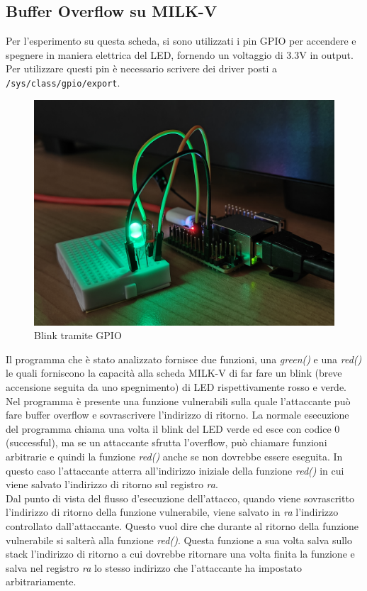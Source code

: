 \subsection*{Buffer Overflow su MILK-V}
Per l'esperimento su questa scheda, si sono utilizzati i pin GPIO per accendere e spegnere in maniera elettrica del LED, fornendo un voltaggio di 3.3V in output. Per utilizzare questi pin è necessario scrivere dei driver posti a \texttt{/sys/class/gpio/export}.
\FloatBarrier
\vspace{1cm}
\begin{figure}[!htbp]
    \centering
    \includegraphics[width=0.5\linewidth]{images/blink.jpg}
    \caption{Blink tramite GPIO}
\end{figure}
\vspace{1cm}
\FloatBarrier
Il programma che è stato analizzato fornisce due funzioni, una \textit{green()} e una \textit{red()} le quali forniscono la capacità alla scheda MILK-V di far fare un blink (breve accensione seguita da uno spegnimento) di LED rispettivamente rosso e verde.\\
Nel programma è presente una funzione vulnerabili sulla quale l'attaccante può fare buffer overflow e sovrascrivere l'indirizzo di ritorno. La normale esecuzione del programma chiama una volta il blink del LED verde ed esce con codice 0 (successful), ma se un attaccante sfrutta l'overflow, può chiamare funzioni arbitrarie e quindi la funzione \textit{red()} anche se non dovrebbe essere eseguita. In questo caso l'attaccante atterra all'indirizzo iniziale della funzione \textit{red()} in cui viene salvato l'indirizzo di ritorno sul registro \textit{ra}.\\
\newline
Dal punto di vista del flusso d'esecuzione dell'attacco, quando viene sovrascritto l'indirizzo di ritorno della funzione vulnerabile, viene salvato in \textit{ra} l'indirizzo controllato dall'attaccante. Questo vuol dire che durante al ritorno della funzione vulnerabile si salterà alla funzione \textit{red()}. Questa funzione a sua volta salva sullo stack l'indirizzo di ritorno a cui dovrebbe ritornare una volta finita la funzione e salva nel registro \textit{ra} lo stesso indirizzo che l'attaccante ha impostato arbitrariamente.\\
